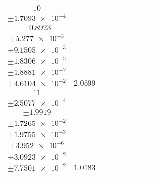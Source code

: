 \documentclass[8pt]{article}
\begin{document}
\begin{longtable}[l]{c c c c c c c c c}
$\num{10}$ & \begin{tabular}[c]{@{}c@{}}$\num{2.8068e-2}$ \\ $\pm\num{1.7093e-4}$\end{tabular} & \begin{tabular}[c]{@{}c@{}}$\num{-0.89883}$ \\ $\pm\num{0.8923}$\end{tabular} & \begin{tabular}[c]{@{}c@{}}$\num{3.7202}$ \\ $\pm\num{5.277e-3}$\end{tabular} & \begin{tabular}[c]{@{}c@{}}$\num{1.5784e+3}$ \\ $\pm\num{9.1505e-3}$\end{tabular} & \begin{tabular}[c]{@{}c@{}}$\num{3.1577}$ \\ $\pm\num{1.8306e-5}$\end{tabular} & \begin{tabular}[c]{@{}c@{}}$\num{2.3708}$ \\ $\pm\num{1.8881e-2}$\end{tabular} & \begin{tabular}[c]{@{}c@{}}$\num{5.045}$ \\ $\pm\num{4.6104e-2}$\end{tabular} & $\num{2.0599}$\\
$\num{11}$ & \begin{tabular}[c]{@{}c@{}}$\num{1.3746e-2}$ \\ $\pm\num{2.5077e-4}$\end{tabular} & \begin{tabular}[c]{@{}c@{}}$\num{-0.99408}$ \\ $\pm\num{1.9919}$\end{tabular} & \begin{tabular}[c]{@{}c@{}}$\num{5.5434}$ \\ $\pm\num{1.7265e-2}$\end{tabular} & \begin{tabular}[c]{@{}c@{}}$\num{1.5802e+3}$ \\ $\pm\num{1.9755e-3}$\end{tabular} & \begin{tabular}[c]{@{}c@{}}$\num{3.1612}$ \\ $\pm\num{3.952e-6}$\end{tabular} & \begin{tabular}[c]{@{}c@{}}$\num{2.3976}$ \\ $\pm\num{3.0923e-2}$\end{tabular} & \begin{tabular}[c]{@{}c@{}}$\num{4.4856}$ \\ $\pm\num{7.7501e-2}$\end{tabular} & $\num{1.0183}$\\

\end{longtable}
\end{document}
